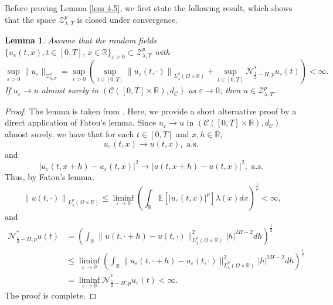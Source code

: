 \documentclass[11pt,reqno]{amsart}
\numberwithin{equation}{section}
\newtheorem{lemma}{Lemma}[section]
\newtheorem{remark}{Remark}[section]
\newcommand{\1}{{\bf 1}}
\newcommand{\2}{{\bf 2}}
\begin{document}
  Before proving Lemma \ref{lem 4.5}, we first  state the following   result, which shows that  the space  $\mathcal{Z}_{\lambda,T}^p$ is closed under convergence.
\begin{lemma}\cite[Lemma 4.6]{HW2022} \label{lem 4.6}
Assume that the  random fields $\{u_{\varepsilon}(t,x), {t\in[0,T],\,x\in\mathbb R}\}_{\varepsilon>0}\subset \mathcal{Z}_{\lambda,T}^p$ with
 $$
\sup_{\varepsilon>0}\|u_{\varepsilon}\|_{\mathcal{Z}_{\lambda,T}^p}=\sup_{\varepsilon>0}\left(\sup_{t\in[0,T]}\left\|u_{\varepsilon}(t,\cdot)\right\|_{L_{\lambda}^p(\Omega\times\mathbb{R})}
+\sup_{t\in[0,T]}\mathcal{N}_{\frac12-H,p}^*u_{\varepsilon}(t)\right)<\infty.
  $$
  If $u_{\varepsilon}\to u$ almost surely in $\left(\mathcal{C}([0,T]\times\mathbb{R}),d_{\mathcal{C}}\right)$ as $\varepsilon\to0$, then $u\in \mathcal{Z}_{\lambda,T}^p$.
\end{lemma}
\begin{proof}  The lemma is taken from \cite[Lemma 4.6]{HW2022}. Here, we provide a short alternative proof by a direct application of Fatou's lemma.
 Since $u_{\varepsilon}\to u$ in $\left(\mathcal{C}([0,T]\times\mathbb{R}),d_{\mathcal{C}}\right)$ almost surely, we have that for  each $t\in[0,T]$ and $x, h\in \mathbb{R}$,
$$u_{\varepsilon}(t,x)\to u(t,x), \text{  a.s. }$$
 and 
 $$\left|u_{\varepsilon}(t,x+h)-u_{\varepsilon}(t,x)\right|^2\to \left|u(t,x+h)-u(t,x)\right|^2, \text{  a.s. }$$   
  Thus, by Fatou's lemma,
$$
\left\|u(t,\cdot)\right\|_{L^p_{\lambda}(\Omega\times \mathbb{R})}\le \liminf\limits_{\varepsilon\to0}\left(\int_{\mathbb{R}}\mathbb{E}[|u_{\varepsilon}(t,x)|^p]\lambda(x)dx\right)^{\frac1{p}} <\infty,
$$
and
\begin{align*}\mathcal{N}_{\frac12-H,p}^*u(t)&=
\left(\int_{\mathbb{R}}\|u(t,\cdot+h)-u(t,\cdot)\|_{L_{\lambda}^p(\Omega\times \mathbb{R})}^2|h|^{2H-2}dh\right)^{\frac12}\\
&\le \liminf\limits_{\varepsilon\to0}\left(\int_{\mathbb{R}}\|u_{\varepsilon}(t,\cdot+h)-u_{\varepsilon}(t,\cdot)\|_{L_{\lambda}^p(\Omega\times \mathbb{R})}^2|h|^{2H-2}dh\right)^{\frac12}\\
&=\liminf\limits_{\varepsilon\to0}\mathcal{N}_{\frac12-H,p}^*u_{\varepsilon}(t)<\infty.
\end{align*}
  The proof is complete.
\end{proof}

  
\end{document}
